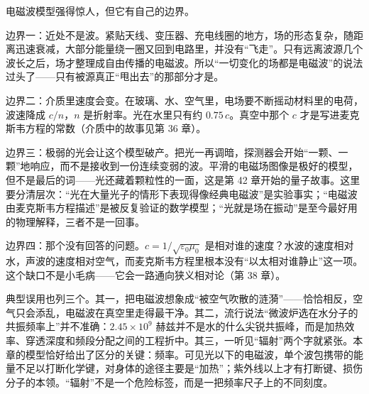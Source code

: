 \begin{mainline}
电磁波模型强得惊人，但它有自己的边界。

边界一：近处不是波。紧贴天线、变压器、充电线圈的地方，场的形态复杂，随距离迅速衰减，大部分能量绕一圈又回到电路里，并没有“飞走”。只有远离波源几个波长之后，场才整理成自由传播的电磁波。所以“一切变化的场都是电磁波”的说法过头了——只有被源真正“甩出去”的那部分才是。

边界二：介质里速度会变。在玻璃、水、空气里，电场要不断摇动材料里的电荷，波速降成 $c/n$，$n$ 是折射率。光在水里只有约 $0.75\,c$。真空中那个 $c$ 才是写进麦克斯韦方程的常数（介质中的故事见第 36 章）。

边界三：极弱的光会让这个模型破产。把光一再调暗，探测器会开始“一颗、一颗”地响应，而不是接收到一份连续变弱的波。平滑的电磁场图像是极好的模型，但不是最后的词——光还藏着颗粒性的一面，这是第 42 章开始的量子故事。这里要分清层次：“光在大量光子的情形下表现得像经典电磁波”是实验事实；“电磁波由麦克斯韦方程描述”是被反复验证的数学模型；“光就是场在振动”是至今最好用的物理解释，三者不是一回事。

边界四：那个没有回答的问题。$c=1/\sqrt{\varepsilon_0\mu_0}$ 是相对谁的速度？水波的速度相对水，声波的速度相对空气，而麦克斯韦方程里根本没有“以太相对谁静止”这一项。这个缺口不是小毛病——它会一路通向狭义相对论（第 38 章）。

典型误用也列三个。其一，把电磁波想象成“被空气吹散的涟漪”——恰恰相反，空气只会添乱，电磁波在真空里走得最干净。其二，流行说法“微波炉选在水分子的共振频率上”并不准确：$2.45\times10^{9}$ 赫兹并不是水的什么尖锐共振峰，而是加热效率、穿透深度和频段分配之间的工程折中。其三，一听见“辐射”两个字就紧张。本章的模型恰好给出了区分的关键：频率。可见光以下的电磁波，单个波包携带的能量不足以打断化学键，对身体的途径主要是“加热”；紫外线以上才有打断键、损伤分子的本领。“辐射”不是一个危险标签，而是一把频率尺子上的不同刻度。
\end{mainline}

